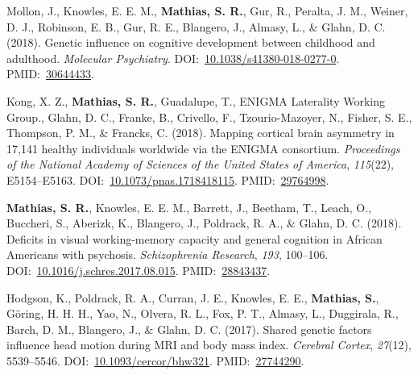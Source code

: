 \documentclass[10pt]{article}
\makeatletter
\newlength{\bibhang}
\newlength{\bibsep}
 {\@listi \global\bibsep\itemsep \global\advance\bibsep by\parsep}
\newenvironment{bibsection}%
        {\vspace{-\baselineskip}\begin{list}{}{%
       \setlength{\leftmargin}{\bibhang}%
       \setlength{\itemindent}{-\leftmargin}%
       \setlength{\itemsep}{\bibsep}%
       \setlength{\parsep}{\z@}%
        \setlength{\partopsep}{0pt}%
        \setlength{\topsep}{0pt}}}
        {\end{list}\vspace{-.6\baselineskip}}
\makeatother
\begin{document}
\begin{bibsection}
\item Mollon, J., Knowles, E. E. M., \textbf{Mathias, S. R.}, Gur, R., Peralta, J. M., Weiner, D. J., Robinson, E. B., Gur, R. E., Blangero, J., Almasy, L., \& Glahn, D. C. (2018). Genetic influence on cognitive development between childhood and adulthood. \emph{Molecular Psychiatry}. DOI:~\href{https://doi.org/10.1038/s41380-018-0277-0}{10.1038/s41380-018-0277-0}. PMID:~\href{https://www.ncbi.nlm.nih.gov/pubmed/?term=30644433}{30644433}.
\item Kong, X. Z., \textbf{Mathias, S. R.}, Guadalupe, T., ENIGMA Laterality Working Group., Glahn, D. C., Franke, B., Crivello, F., Tzourio-Mazoyer, N., Fisher, S. E., Thompson, P. M., \& Francks, C. (2018). Mapping cortical brain asymmetry in 17,141 healthy individuals worldwide via the ENIGMA consortium. \emph{Proceedings of the National Academy of Sciences of the United States of America}, \emph{115}(22), E5154--E5163. DOI:~\href{https://doi.org/10.1073/pnas.1718418115}{10.1073/pnas.1718418115}. PMID:~\href{https://www.ncbi.nlm.nih.gov/pubmed/?term=29764998}{29764998}.
\item \textbf{Mathias, S. R.}, Knowles, E. E. M., Barrett, J., Beetham, T., Leach, O., Buccheri, S., Aberizk, K., Blangero, J., Poldrack, R. A., \& Glahn, D. C. (2018). Deficits in visual working-memory capacity and general cognition in African Americans with psychosis. \emph{Schizophrenia Research}, \emph{193}, 100--106. DOI:~\href{https://doi.org/10.1016/j.schres.2017.08.015}{10.1016/j.schres.2017.08.015}. PMID:~\href{https://www.ncbi.nlm.nih.gov/pubmed/?term=28843437}{28843437}.
\item Hodgson, K., Poldrack, R. A., Curran, J. E., Knowles, E. E., \textbf{Mathias, S.}, Göring, H. H. H., Yao, N., Olvera, R. L., Fox, P. T., Almasy, L., Duggirala, R., Barch, D. M., Blangero, J., \& Glahn, D. C. (2017). Shared genetic factors influence head motion during MRI and body mass index. \emph{Cerebral Cortex}, \emph{27}(12), 5539--5546. DOI:~\href{https://doi.org/10.1093/cercor/bhw321}{10.1093/cercor/bhw321}. PMID:~\href{https://www.ncbi.nlm.nih.gov/pubmed/?term=27744290}{27744290}.

\end{bibsection}
\end{document}
